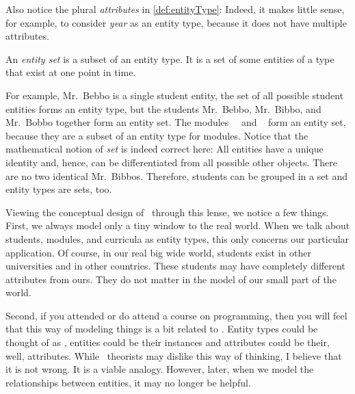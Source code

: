 Also notice the plural \emph{attributes} in \cref{def:entityType}:%
%
Indeed, it makes little sense, for example, to consider \emph{year} as an entity type, because it does not have multiple attributes.%
%
\begin{definition}%
An \emph{entity set} is a subset of an entity type. %
It is a set of some entities of a type that exist at one point in time.%
\end{definition}%
%
For example, Mr.~Bebbo is a single student entity, the set of all possible student entities forms an entity type, but the students Mr.~Bebbo, Mr.~Bibbo, and Mr.~Bobbo together form an entity set.
The modules~~\cite{programmingWithPython} and ~\cite{databases} form an entity set, because they are a subset of an entity type for modules.
Notice that the mathematical notion of \emph{set} is indeed correct here:
All entities have a unique identity and, hence, can be differentiated from all possible other objects.
There are no two identical Mr.~Bibbos.
Therefore, students can be grouped in a set and entity types are sets, too.

Viewing the conceptual design of \dbs\ through this lense, we notice a few things.
First, we always model only a tiny window to the real world.
When we talk about students, modules, and curricula as entity types, this only concerns our particular application.
Of course, in our real big wide world, students exist in other universities and in other countries.
These students may have completely different attributes from ours.
They do not matter in the model of our small part of the world.

Second, if you attended or do attend a course on programming, then you will feel that this way of modeling things is a bit related to .
Entity types could be thought of as , entities could be their instances and attributes could be their, well, attributes.
While \db\ theorists may dislike this way of thinking, I believe that it is not wrong.
It is a viable analogy.
However, later, when we model the relationships between entities, it may no longer be helpful.%
\endhsection%
%
